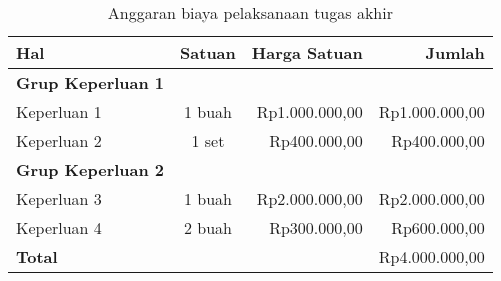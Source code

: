 \begin{table}[htbp]
	\small
	\centering
	\caption{Anggaran biaya pelaksanaan tugas akhir}
	\label{table:contoh_anggaran}
	\begin{tabular}{lcrr}
		\toprule
		\multicolumn{1}{l}{\textbf{Hal}} & \multicolumn{1}{l}{\textbf{Satuan}} & \multicolumn{1}{l}{\textbf{Harga Satuan}} & \multicolumn{1}{r}{\textbf{Jumlah}}\\
		\midrule
		\textbf{Grup Keperluan 1} \\
		Keperluan 1 & 1 buah & Rp1.000.000,00 & Rp1.000.000,00 \\
		Keperluan 2 & 1 set & Rp400.000,00 & Rp400.000,00 \\
		\midrule
		\textbf{Grup Keperluan 2} \\
		Keperluan 3 & 1 buah & Rp2.000.000,00 & Rp2.000.000,00 \\
		Keperluan 4 & 2 buah & Rp300.000,00 & Rp600.000,00 \\
		\midrule
		\textbf{Total} & & & Rp4.000.000,00 \\
		\bottomrule
	\end{tabular}
\end{table}

